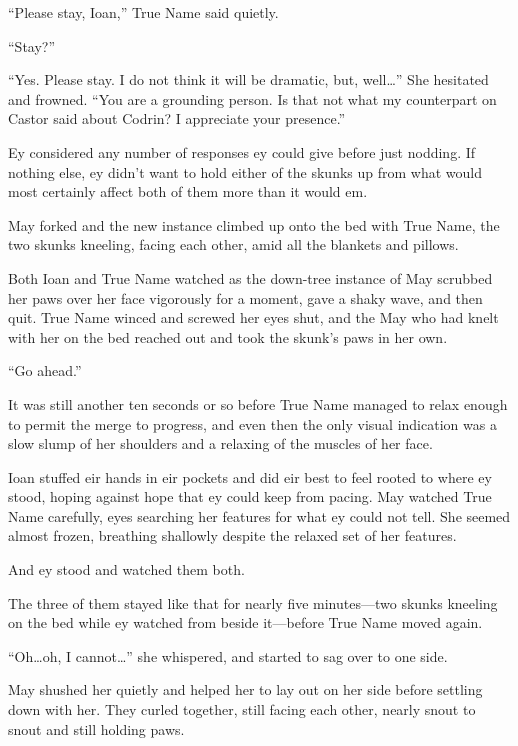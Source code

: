 ``Please stay, Ioan,'' True Name said quietly.

``Stay?''

``Yes. Please stay. I do not think it will be dramatic, but, well\ldots{}'' She hesitated and frowned. ``You are a grounding person. Is that not what my counterpart on Castor said about Codrin? I appreciate your presence.''

Ey considered any number of responses ey could give before just nodding. If nothing else, ey didn't want to hold either of the skunks up from what would most certainly affect both of them more than it would em.

May forked and the new instance climbed up onto the bed with True Name, the two skunks kneeling, facing each other, amid all the blankets and pillows.


Both Ioan and True Name watched as the down-tree instance of May scrubbed her paws over her face vigorously for a moment, gave a shaky wave, and then quit. True Name winced and screwed her eyes shut, and the May who had knelt with her on the bed reached out and took the skunk's paws in her own.

``Go ahead.''

It was still another ten seconds or so before True Name managed to relax enough to permit the merge to progress, and even then the only visual indication was a slow slump of her shoulders and a relaxing of the muscles of her face.

Ioan stuffed eir hands in eir pockets and did eir best to feel rooted to where ey stood, hoping against hope that ey could keep from pacing. May watched True Name carefully, eyes searching her features for what ey could not tell. She seemed almost frozen, breathing shallowly despite the relaxed set of her features.

And ey stood and watched them both.

The three of them stayed like that for nearly five minutes—two skunks kneeling on the bed while ey watched from beside it—before True Name moved again.

``Oh\ldots oh, I cannot\ldots{}'' she whispered, and started to sag over to one side.

May shushed her quietly and helped her to lay out on her side before settling down with her. They curled together, still facing each other, nearly snout to snout and still holding paws.

